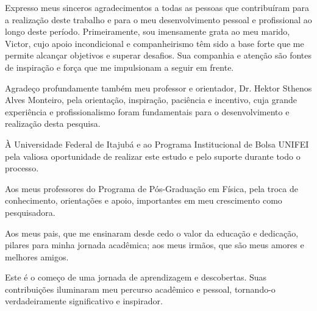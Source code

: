 \begin{agradecimentos}

Expresso meus sinceros agradecimentos a todas as pessoas que contribuíram para a realização deste trabalho e para o meu desenvolvimento pessoal e profissional ao longo deste período. Primeiramente, sou imensamente grata ao meu marido, Victor, cujo apoio incondicional e companheirismo têm sido a base forte que me permite alcançar objetivos e superar desafios. Sua companhia e atenção são fontes de inspiração e força que me impulsionam a seguir em frente.

Agradeço profundamente também meu professor e orientador, Dr. Hektor Sthenos Alves Monteiro, pela orientação, inspiração, paciência e incentivo, cuja grande experiência e profissionalismo foram fundamentais para o desenvolvimento e realização desta pesquisa.

À Universidade Federal de Itajubá e ao Programa Institucional de Bolsa UNIFEI pela valiosa oportunidade de realizar este estudo e pelo suporte durante todo o processo.

Aos meus professores do Programa de Pós-Graduação em Física, pela troca de conhecimento, orientações e apoio, importantes em meu crescimento como pesquisadora.

Aos meus pais, que me ensinaram desde cedo o valor da educação e dedicação, pilares para minha jornada acadêmica; aos meus irmãos, que são meus amores e melhores amigos.

Este é o começo de uma jornada de aprendizagem e descobertas. Suas contribuições iluminaram meu percurso acadêmico e pessoal, tornando-o verdadeiramente significativo e inspirador.

\end{agradecimentos}
